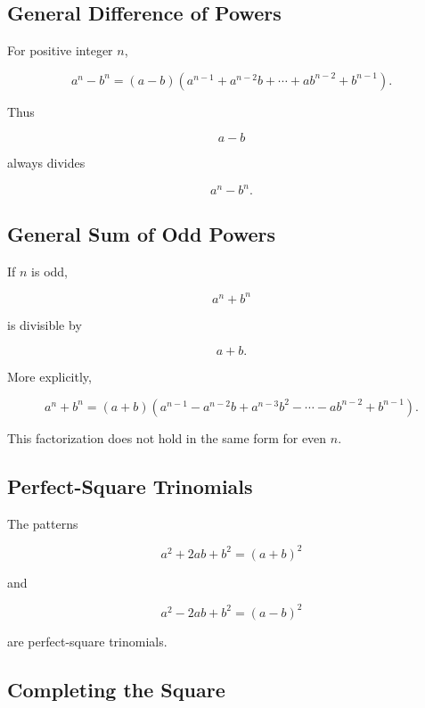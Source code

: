 \subsection{General Difference of Powers}
\label{subsec:general-difference-powers}

For positive integer \(n\),

\[
\boxed{
a^n-b^n
=
(a-b)
\left(
a^{n-1}
+
a^{n-2}b
+
\cdots
+
ab^{n-2}
+
b^{n-1}
\right).
}
\]

Thus

\[
\boxed{
a-b
}
\]

always divides

\[
\boxed{
a^n-b^n.
}
\]

\subsection{General Sum of Odd Powers}
\label{subsec:general-sum-odd-powers}

If \(n\) is odd,

\[
\boxed{
a^n+b^n
}
\]

is divisible by

\[
\boxed{
a+b.
}
\]

More explicitly,

\[
\boxed{
a^n+b^n
=
(a+b)
\left(
a^{n-1}
-a^{n-2}b
+a^{n-3}b^2
-\cdots
-ab^{n-2}
+b^{n-1}
\right).
}
\]

This factorization does not hold in the same form for even \(n\).

\subsection{Perfect-Square Trinomials}
\label{subsec:perfect-square-trinomials}

The patterns

\[
\boxed{
a^2+2ab+b^2
=
(a+b)^2
}
\]

and

\[
\boxed{
a^2-2ab+b^2
=
(a-b)^2
}
\]

are perfect-square trinomials.

\subsection{Completing the Square}
\label{subsec:completing-square-identity}

